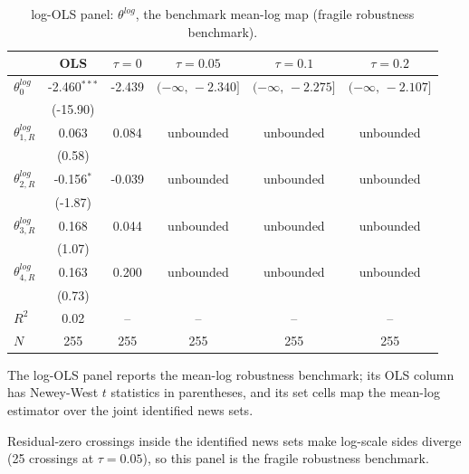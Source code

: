 \begin{table}[!htbp]
\centering
\begin{threeparttable}
\caption{log-OLS panel: $\theta^{log}$, the benchmark mean-log map (fragile robustness benchmark).}
\label{tab:log_var_eq_panel_logols}
\footnotesize\setlength{\tabcolsep}{3pt}
\begin{tabular}{lccccc}
\toprule
 & OLS & $\tau{=}0$ & $\tau{=}0.05$ & $\tau{=}0.1$ & $\tau{=}0.2$ \\
\midrule
$\theta^{log}_0$ & -2.460$^{***}$ & -2.439 & $(-\infty,\,-2.340]$ & $(-\infty,\,-2.275]$ & $(-\infty,\,-2.107]$ \\
 & (-15.90) &  &  &  &  \\
\midrule
$\theta^{log}_{1,R}$ & 0.063 & 0.084 & unbounded & unbounded & unbounded \\
 & (0.58) &  &  &  &  \\
$\theta^{log}_{2,R}$ & -0.156$^{*}$ & -0.039 & unbounded & unbounded & unbounded \\
 & (-1.87) &  &  &  &  \\
$\theta^{log}_{3,R}$ & 0.168 & 0.044 & unbounded & unbounded & unbounded \\
 & (1.07) &  &  &  &  \\
$\theta^{log}_{4,R}$ & 0.163 & 0.200 & unbounded & unbounded & unbounded \\
 & (0.73) &  &  &  &  \\
$R^2$ & 0.02 & -- & -- & -- & -- \\
$N$ & 255 & 255 & 255 & 255 & 255 \\
\bottomrule
\end{tabular}
\begin{tablenotes}[flushleft]
\scriptsize
\item The log-OLS panel reports the mean-log robustness benchmark; its OLS column has Newey-West $t$ statistics in parentheses, and its set cells map the mean-log estimator over the joint identified news sets.
\item Residual-zero crossings inside the identified news sets make log-scale sides diverge (25 crossings at $\tau{=}0.05$), so this panel is the fragile robustness benchmark.
\end{tablenotes}
\end{threeparttable}
\end{table}
